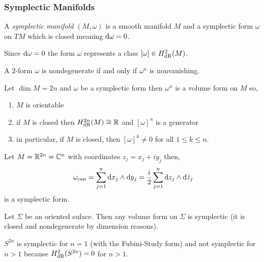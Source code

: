 \documentclass[12pt]{article}
\begin{document}
\subsubsection{Symplectic Manifolds}

\begin{defn}
A \textit{symplectic manifold} $(M, \omega)$ is a smooth manifold $M$ and a symplectic form $\omega$ on $TM$ which is closed meaning $\mathrm{d}{\omega} = 0$. 
\end{defn}

\begin{rmk}
Since $\mathrm{d}{\omega} = 0$ the form $\omega$ represents a class $[\omega] \in H^2_{\mathrm{dR}}(M)$. 
\end{rmk}

\begin{prop}
A $2$-form $\omega$ is nondegenerate if and only if $\omega^n$ is nonvanishing.
\end{prop}

\begin{cor}
Let $\dim{M} = 2n$ and $\omega$ be a symplectic form then $\omega^n$ is a volume form on $M$ so,
\begin{enumerate}
\item $M$ is orientable
\item if $M$ is closed then $H^{2n}_{\mathrm{dR}}(M) \cong \mathbb{R}$ and $[\omega]^n$ is a generator
\item in particular, if $M$ is closed, then $[\omega]^k \neq 0$ for all $1 \le k \le n$. 
\end{enumerate}
\end{cor}

\begin{example}
Let $M = \mathbb{R}^{2n} = \mathbb{C}^n$ with coordinates $z_j = x_j + i y_j$  then,
\[ \omega_{\text{can}} = \sum_{j = 1}^n \mathrm{d}{x_j} \wedge \mathrm{d}{y_j} = \frac{i}{2} \sum_{j = 1}^n \mathrm{d}{z_j} \wedge \mathrm{d}{\bar{z}_j} \] 
is a symplectic form.
\end{example}

\begin{example}
Let $\Sigma$ be an oriented suface. Then any volume form on $\Sigma$ is symplectic (it is closed and nondegenerate by dimension reasons).
\end{example}

\begin{example}
$S^{2n}$ is symplectic for $n = 1$ (with the Fubini-Study form) and not symplectic for $n > 1$ because $H^2_{\mathrm{dR}}(S^{2n}) = 0$ for $n  > 1$. 
\end{example}
\end{document}

